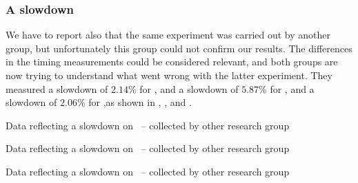 \subsubsection{A slowdown}
\label{sec:slowdown}

We have to report also that the same experiment was carried out by another group, but unfortunately this group could not confirm our results. The differences in the timing measurements could be considered relevant, and both groups are now trying to understand what went wrong with the latter experiment. They measured a slowdown of $2.14 \%$ for \bzip, and a slowdown of $5.87 \%$ for \gzip, and a slowdown of $2.06 \%$ for \gcc,as shown in , , and .

\begin{table}
  \centering
  \begin{tiny}
  
  \end{tiny}
  \caption{Data reflecting a slowdown on \bzip\ -- collected by other research group}
  \label{tab:slowdownb}
\end{table}

\begin{table}
  \centering
  \begin{tiny}
  
  \end{tiny}
  \caption{Data reflecting a slowdown on \gzip\ -- collected by other research group}
  \label{tab:slowdownz}
\end{table}

\begin{table}
  \centering
  \begin{tiny}
  
  \end{tiny}
  \caption{Data reflecting a slowdown on \gcc\ -- collected by other research group}
  \label{tab:slowdowngcc}
\end{table}

